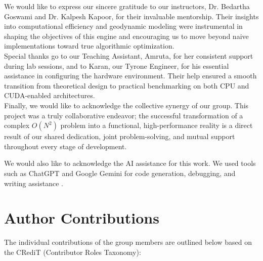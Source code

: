 We would like to express our sincere gratitude to our instructors, Dr. Bedartha Goswami and Dr. Kalpesh Kapoor, for their invaluable mentorship. Their insights into computational efficiency and geodynamic modeling were instrumental in shaping the objectives of this engine and encouraging us to move beyond naive implementations toward true algorithmic optimization.\\

Special thanks go to our Teaching Assistant, Amruta, for her consistent support during lab sessions, and to Karan, our Tyrone Engineer, for his essential assistance in configuring the hardware environment. Their help ensured a smooth transition from theoretical design to practical benchmarking on both CPU and CUDA-enabled architectures.\\

Finally, we would like to acknowledge the collective synergy of our group. This project was a truly collaborative endeavor; the successful transformation of a complex $O(N^2)$ problem into a functional, high-performance reality is a direct result of our shared dedication, joint problem-solving, and mutual support throughout every stage of development.

We would also like to acknowledge the AI assistance for this work. We used tools such as ChatGPT and Google Gemini for code generation, debugging, and writing assistance \cite{ai_tools_2026}.


\section{Author Contributions}

The individual contributions of the group members are outlined below based on the CRediT (Contributor Roles Taxonomy):

